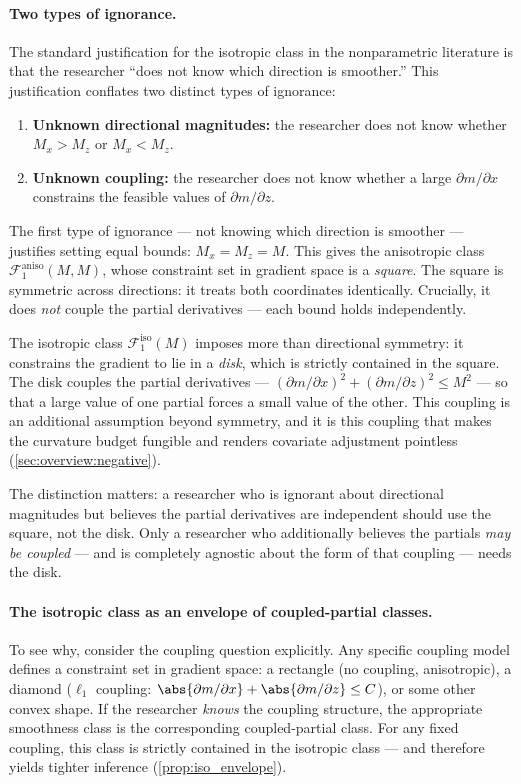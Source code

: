 \paragraph{Two types of ignorance.}
The standard justification for the isotropic class in the nonparametric literature is that the researcher ``does not know which direction is smoother.''
This justification conflates two distinct types of ignorance:
\begin{enumerate}
	\item \textbf{Unknown directional magnitudes:} the researcher does not know whether $M_x > M_z$ or $M_x < M_z$.
	\item \textbf{Unknown coupling:} the researcher does not know whether a large $\partial m / \partial x$ constrains the feasible values of $\partial m / \partial z$.
\end{enumerate}
The first type of ignorance --- not knowing which direction is smoother --- justifies setting equal bounds: $M_x = M_z = M$.
This gives the anisotropic class $\mathcal{F}_1^{\mathrm{aniso}}(M, M)$, whose constraint set in gradient space is a \emph{square}.
The square is symmetric across directions: it treats both coordinates identically.
Crucially, it does \emph{not} couple the partial derivatives --- each bound holds independently.

The isotropic class $\mathcal{F}_1^{\mathrm{iso}}(M)$ imposes more than directional symmetry: it constrains the gradient to lie in a \emph{disk}, which is strictly contained in the square.
The disk couples the partial derivatives --- $(\partial m / \partial x)^2 + (\partial m / \partial z)^2 \leq M^2$ --- so that a large value of one partial forces a small value of the other.
This coupling is an additional assumption beyond symmetry, and it is this coupling that makes the curvature budget fungible and renders covariate adjustment pointless (\cref{sec:overview:negative}).

The distinction matters: a researcher who is ignorant about directional magnitudes but believes the partial derivatives are independent should use the square, not the disk.
Only a researcher who additionally believes the partials \emph{may be coupled} --- and is completely agnostic about the form of that coupling --- needs the disk.

\paragraph{The isotropic class as an envelope of coupled-partial classes.}
To see why, consider the coupling question explicitly.
Any specific coupling model defines a constraint set in gradient space: a rectangle (no coupling, anisotropic), a diamond ($\ell_1$ coupling: $\abs{\partial m / \partial x} + \abs{\partial m / \partial z} \leq C$), or some other convex shape.
If the researcher \emph{knows} the coupling structure, the appropriate smoothness class is the corresponding coupled-partial class.
For any fixed coupling, this class is strictly contained in the isotropic class --- and therefore yields tighter inference (\cref{prop:iso_envelope}).


